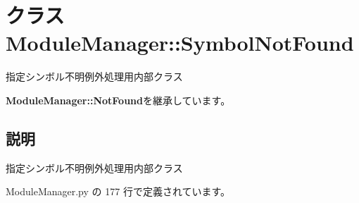 \section{クラス ModuleManager::SymbolNotFound}
\label{classsource__py_1_1_module_manager_1_1_module_manager_1_1_symbol_not_found}
指定シンボル不明例外処理用内部クラス  


{\bf ModuleManager::NotFound}を継承しています。



\subsection{説明}
指定シンボル不明例外処理用内部クラス 

 ModuleManager.py の 177 行で定義されています。